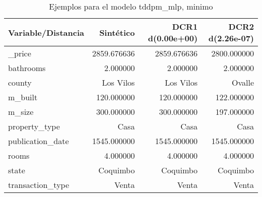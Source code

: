 \begin{table}[H]
\centering
\fontsize{10}{14}\selectfont
\caption{Ejemplos para el modelo tddpm\_mlp, minimo}
\label{table-example-economicos-a-2-tddpm_mlp-min}
\begin{tabular}{|l|r|r|r|}
\hline
\rowcolor[gray]{0.8}
Variable/Distancia & Sintético & DCR1 d(0.00e+00) & DCR2 d(2.26e-07) \\
\hline \_price & \cellcolor[rgb]{0.9, 0.54, 0.52} 2859.676636 & \cellcolor[rgb]{0.9, 0.54, 0.52} 2859.676636 & 2800.000000 \\
\hline bathrooms & \cellcolor[rgb]{0.9, 0.54, 0.52} 2.000000 & \cellcolor[rgb]{0.9, 0.54, 0.52} 2.000000 & \cellcolor[rgb]{0.9, 0.54, 0.52} 2.000000 \\
\hline county & \cellcolor[rgb]{0.9, 0.54, 0.52} Los Vilos & \cellcolor[rgb]{0.9, 0.54, 0.52} Los Vilos & Ovalle \\
\hline m\_built & \cellcolor[rgb]{0.9, 0.54, 0.52} 120.000000 & \cellcolor[rgb]{0.9, 0.54, 0.52} 120.000000 & 122.000000 \\
\hline m\_size & \cellcolor[rgb]{0.9, 0.54, 0.52} 300.000000 & \cellcolor[rgb]{0.9, 0.54, 0.52} 300.000000 & 197.000000 \\
\hline property\_type & \cellcolor[rgb]{0.9, 0.54, 0.52} Casa & \cellcolor[rgb]{0.9, 0.54, 0.52} Casa & \cellcolor[rgb]{0.9, 0.54, 0.52} Casa \\
\hline publication\_date & \cellcolor[rgb]{0.9, 0.54, 0.52} 1545.000000 & \cellcolor[rgb]{0.9, 0.54, 0.52} 1545.000000 & \cellcolor[rgb]{0.9, 0.54, 0.52} 1545.000000 \\
\hline rooms & \cellcolor[rgb]{0.9, 0.54, 0.52} 4.000000 & \cellcolor[rgb]{0.9, 0.54, 0.52} 4.000000 & \cellcolor[rgb]{0.9, 0.54, 0.52} 4.000000 \\
\hline state & \cellcolor[rgb]{0.9, 0.54, 0.52} Coquimbo & \cellcolor[rgb]{0.9, 0.54, 0.52} Coquimbo & \cellcolor[rgb]{0.9, 0.54, 0.52} Coquimbo \\
\hline transaction\_type & \cellcolor[rgb]{0.9, 0.54, 0.52} Venta & \cellcolor[rgb]{0.9, 0.54, 0.52} Venta & \cellcolor[rgb]{0.9, 0.54, 0.52} Venta \\
\hline
\end{tabular}
\end{table}
